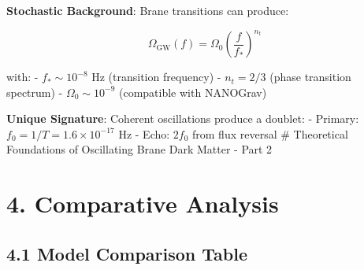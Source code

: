 \documentclass[
  11pt,
]{report}
\begin{document}
\textbf{Stochastic Background}: Brane transitions can produce:

\[\Omega_\text{GW}(f) = \Omega_0 \left(\frac{f}{f_*}\right)^{n_t}\]

with: - \(f_* \sim 10^{-8}\) Hz (transition frequency) - \(n_t = 2/3\)
(phase transition spectrum) - \(\Omega_0 \sim 10^{-9}\) (compatible with
NANOGrav)

\textbf{Unique Signature}: Coherent oscillations produce a doublet: -
Primary: \(f_0 = 1/T = 1.6 \times 10^{-17}\) Hz - Echo: \(2f_0\) from
flux reversal \newpage \# Theoretical Foundations of Oscillating Brane
Dark Matter - Part 2

\section{4. Comparative Analysis}\label{comparative-analysis}

\subsection{4.1 Model Comparison Table}\label{model-comparison-table}
\end{document}

